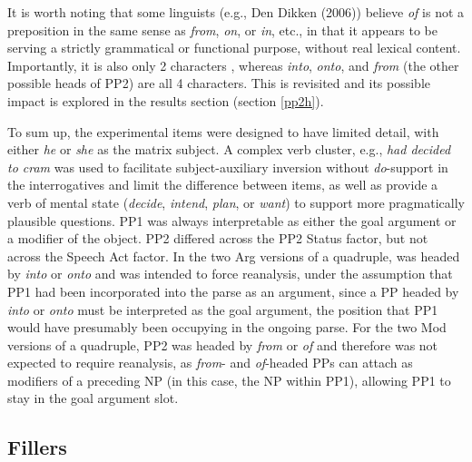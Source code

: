 \documentclass[12pt,oneside]{book}
\begin{document}
It is worth noting that some linguists (e.g., Den Dikken (2006)) believe \emph{of} is not a preposition in the same sense as \emph{from}, \emph{on}, or \emph{in}, etc., in that it appears to be serving a strictly grammatical or functional purpose, without real lexical content. Importantly, it is also only 2 characters , whereas \emph{into}, \emph{onto}, and \emph{from} (the other possible heads of PP2) are all 4 characters. This is revisited and its possible impact is explored in the results section (section \ref{pp2h}).

To sum up, the experimental items were designed to have limited detail, with either \emph{he} or \emph{she} as the matrix subject. A complex verb cluster, e.g., \emph{had decided to cram} was used to facilitate subject-auxiliary inversion without \emph{do}-support in the interrogatives and limit the difference between items, as well as provide a verb of mental state (\emph{decide}, \emph{intend}, \emph{plan}, or \emph{want}) to support more pragmatically plausible questions. PP1 was always interpretable as either the goal argument or a modifier of the object. PP2 differed across the PP2 Status factor, but not across the Speech Act factor. In the two Arg versions of a quadruple,  was headed by \emph{into} or \emph{onto} and was intended to force reanalysis, under the assumption that PP1 had been incorporated into the parse as an argument, since a PP headed by \emph{into} or \emph{onto} must be interpreted as the goal argument,  the position that PP1 would have presumably been occupying in the ongoing parse. For the two Mod versions of a quadruple, PP2 was headed by \emph{from} or \emph{of} and therefore was not expected to require reanalysis, as \emph{from}- and \emph{of}-headed PPs can attach as modifiers of a preceding NP (in this case, the NP within PP1), allowing PP1 to stay in the goal argument slot.

\hypertarget{fillers}{%
\subsection{Fillers}\label{fillers}}
\end{document}
